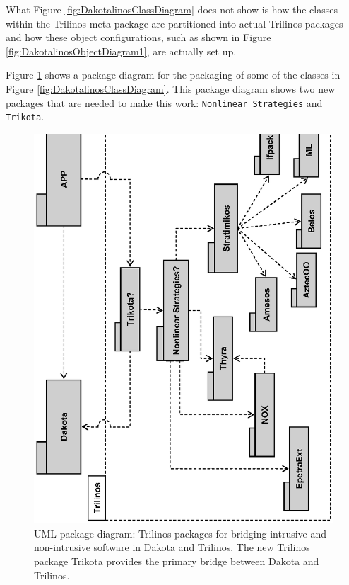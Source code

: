 \documentclass[pdf,ps2pdf,11pt]{SANDreport}
\begin{document}
What Figure {}\ref{fig:DakotalinosClassDiagram} does not show is how the
classes within the Trilinos meta-package are partitioned into actual Trilinos
packages and how these object configurations, such as shown in Figure
{}\ref{fig:DakotalinosObjectDiagram1}, are actually set up.

Figure {}\ref{fig:TrikotaPackageDiagram} shows a package diagram for the
packaging of some of the classes in Figure
{}\ref{fig:DakotalinosClassDiagram}.  This package diagram shows two new
packages that are needed to make this work: {}\texttt{Nonlinear Strategies}
and {}\texttt{Trikota}.


{\bsinglespace
\begin{figure}
\begin{center}
\includegraphics*[angle=270,scale=0.75
]{TrikotaPackageDiagram}
\end{center}
\caption{
\label{fig:TrikotaPackageDiagram}
UML package diagram: Trilinos packages for bridging intrusive and
non-intrusive software in Dakota and Trilinos.  The new Trilinos package
Trikota provides the primary bridge between Dakota and Trilinos.}
\end{figure}
\esinglespace}
\end{document}

